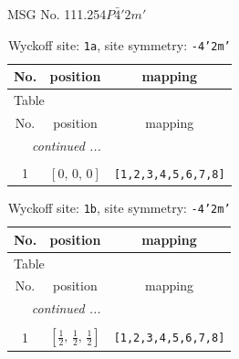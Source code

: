 \documentclass[fleqn,8pt]{jsarticle}
\begin{document}
\setcounter{MaxMatrixCols}{32}

\renewcommand{\tablename}{Table~}
\renewcommand{\figurename}{Figure~}
\begin{center}
\LARGE
MSG No. 111.254\quad$P\bar{4}'2m'$
\end{center}
\renewcommand{\arraystretch}{1.2}
\begin{longtable}{ccc}
\caption{Wyckoff site: {\tt 1a}, site symmetry: {\tt -4'2m'}}
 \\
 \hline \hline
No. & position & mapping \\ \hline \endfirsthead

\multicolumn{2}{l}{\tablename\ \thetable{}} \\
 \hline \hline
No. & position & mapping \\ \hline \endhead

 \hline \hline
\multicolumn{2}{r}{\footnotesize\it continued ...} \\ \endfoot

 \hline \hline
\multicolumn{2}{r}{} \\ \endlastfoot

1 & $\left[ 0,\, 0,\, 0 \right]$ & {\tt [1,2,3,4,5,6,7,8]} \\
\end{longtable}
\renewcommand{\arraystretch}{1.2}
\begin{longtable}{ccc}
\caption{Wyckoff site: {\tt 1b}, site symmetry: {\tt -4'2m'}}
 \\
 \hline \hline
No. & position & mapping \\ \hline \endfirsthead

\multicolumn{2}{l}{\tablename\ \thetable{}} \\
 \hline \hline
No. & position & mapping \\ \hline \endhead

 \hline \hline
\multicolumn{2}{r}{\footnotesize\it continued ...} \\ \endfoot

 \hline \hline
\multicolumn{2}{r}{} \\ \endlastfoot

1 & $\left[ \frac{1}{2},\, \frac{1}{2},\, \frac{1}{2} \right]$ & {\tt [1,2,3,4,5,6,7,8]} \\
\end{longtable}
\renewcommand{\arraystretch}{1.2}
\end{document}
